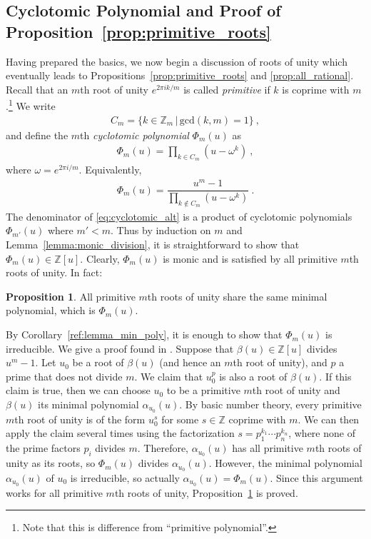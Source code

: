 \documentclass[aps,prb,twocolumn,superscriptaddress,floatfix,10pt,nofootinbib]{revtex4-2}
\newcommand{\ie}{\begin{equation}\begin{aligned}}
\newcommand{\fe}{\end{aligned}\end{equation}}
\theoremstyle{definition}
\newtheorem{proposition}[definition]{Proposition}
\begin{document}
\subsection{Cyclotomic Polynomial and Proof of Proposition~\ref{prop:primitive_roots}}\label{app:cyclotomic}
Having prepared the basics, we now begin a discussion of roots of unity which eventually leads to Propositions~\ref{prop:primitive_roots} and \ref{prop:all_rational}. Recall that an $m$th root of unity $e^{2\pi i k/m}$ is called \textit{primitive} if $k$ is coprime with $m$.\footnote{Note that this is difference from ``primitive polynomial''.} We write
\ie\label{eq:cyclotomic_def}
C_m=\{k\in\mathbb{Z}_m\,|\, \text{gcd}(k,m)=1\}~,
\fe
and define the $m$th \textit{cyclotomic polynomial} $\Phi_m(u)$ as
\ie
\Phi_m(u)=\prod_{k\in C_m}(u-\omega^k)~,
\fe
where $\omega=e^{2\pi i/m}$. Equivalently,
\ie\label{eq:cyclotomic_alt}
\Phi_m(u)=\dfrac{u^m-1}{\prod\limits_{k\notin C_m}(u-\omega^k)}~.
\fe
The denominator of \eqref{eq:cyclotomic_alt} is a product of cyclotomic polynomials $\Phi_{m'}(u)$ where $m'<m$. Thus by induction on $m$ and Lemma~\ref{lemma:monic_division}, it is straightforward to show that $\Phi_m(u)\in\mathbb{Z}[u]$. Clearly, $\Phi_m(u)$ is monic and is satisfied by all primitive $m$th roots of unity. In fact:
\begin{proposition}\label{prop:cyclotomic_min_poly}
    All primitive $m$th roots of unity share the same minimal polynomial, which is $\Phi_m(u)$.
\end{proposition}
\noindent By Corollary~\ref{ref:lemma_min_poly}, it is enough to show that $\Phi_m(u)$ is irreducible. We give a proof found in \cite{Weintraub2013}. Suppose that $\beta(u)\in\mathbb{Z}[u]$ divides $u^m-1$. Let $u_0$ be a root of $\beta(u)$ (and hence an $m$th root of unity), and $p$ a prime that does not divide $m$. We claim that $u_0^p$ is also a root of $\beta(u)$. If this claim is true, then we can choose $u_0$ to be a primitive $m$th root of unity and $\beta(u)$ its minimal polynomial $\alpha_{u_0}(u)$. By basic number theory, every primitive $m$th root of unity is of the form $u_0^s$ for some $s\in\mathbb{Z}$ coprime with $m$. We can then apply the claim several times using the factorization $s=p_1^{k_1}\cdots p_n^{k_n}$, where none of the prime factors $p_i$ divides $m$. Therefore, $\alpha_{u_0}(u)$ has all primitive $m$th roots of unity as its roots, so $\Phi_m(u)$ divides $\alpha_{u_0}(u)$. However, the minimal polynomial $\alpha_{u_0}(u)$ of $u_0$ is irreducible, so actually $\alpha_{u_0}(u)=\Phi_m(u)$. Since this argument works for all primitive $m$th roots of unity, Proposition~\ref{prop:cyclotomic_min_poly} is proved.
\end{document}
